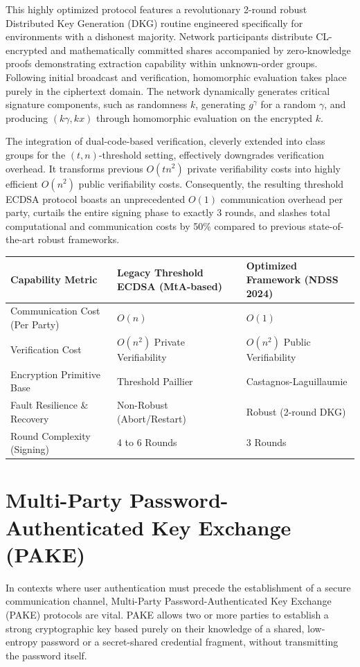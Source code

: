 \documentclass[11pt, a4paper]{article}
\begin{document}
This highly optimized protocol features a revolutionary 2-round robust Distributed Key Generation (DKG) routine engineered specifically for environments with a dishonest majority. Network participants distribute CL-encrypted and mathematically committed shares accompanied by zero-knowledge proofs demonstrating extraction capability within unknown-order groups. Following initial broadcast and verification, homomorphic evaluation takes place purely in the ciphertext domain. The network dynamically generates critical signature components, such as randomness $k$, generating $g^{\gamma}$ for a random $\gamma$, and producing $(k\gamma, kx)$ through homomorphic evaluation on the encrypted $k$.

The integration of dual-code-based verification, cleverly extended into class groups for the $(t, n)$-threshold setting, effectively downgrades verification overhead. It transforms previous $O(tn^2)$ private verifiability costs into highly efficient $O(n^2)$ public verifiability costs. Consequently, the resulting threshold ECDSA protocol boasts an unprecedented $O(1)$ communication overhead per party, curtails the entire signing phase to exactly 3 rounds, and slashes total computational and communication costs by 50\% compared to previous state-of-the-art robust frameworks.

\begin{table}[h!]
\centering
\small
\begin{tabular}{p{4cm} p{4cm} p{4cm}}
\toprule
\textbf{Capability Metric} & \textbf{Legacy Threshold ECDSA (MtA-based)} & \textbf{Optimized Framework (NDSS 2024)} \\
\midrule
Communication Cost (Per Party) & $O(n)$ & $O(1)$ \\
Verification Cost & $O(n^2)$ Private Verifiability & $O(n^2)$ Public Verifiability \\
Encryption Primitive Base & Threshold Paillier & Castagnos-Laguillaumie \\
Fault Resilience \& Recovery & Non-Robust (Abort/Restart) & Robust (2-round DKG) \\
Round Complexity (Signing) & 4 to 6 Rounds & 3 Rounds \\
\bottomrule
\end{tabular}
\end{table}

\section*{Multi-Party Password-Authenticated Key Exchange (PAKE)}
In contexts where user authentication must precede the establishment of a secure communication channel, Multi-Party Password-Authenticated Key Exchange (PAKE) protocols are vital. PAKE allows two or more parties to establish a strong cryptographic key based purely on their knowledge of a shared, low-entropy password or a secret-shared credential fragment, without transmitting the password itself.
\end{document}
